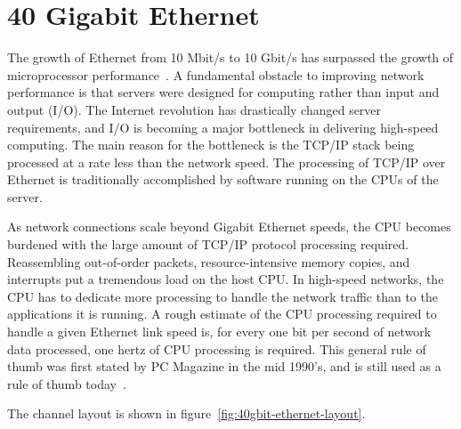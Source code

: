 
\chapter{40 Gigabit Ethernet}

The growth of Ethernet from 10 Mbit/s to 10 Gbit/s has surpassed
the growth of microprocessor performance~\cite{10gea-toe}.
A fundamental obstacle to improving network performance is that servers were designed
for computing rather than input and output (I/O).
The Internet revolution has drastically changed server requirements,
and I/O is becoming a major bottleneck in delivering high-speed computing.
The main reason for the bottleneck is the TCP/IP stack being processed at a rate less than the network speed.
The processing of TCP/IP over Ethernet is traditionally accomplished by software running on the CPUs of the server.

As network connections scale beyond Gigabit Ethernet speeds,
the CPU becomes burdened with the large amount of TCP/IP protocol processing required.
Reassembling out-of-order packets, resource-intensive memory copies, and interrupts put a tremendous load on the host CPU.
In high-speed networks, the CPU has to dedicate more processing to handle the network traffic than to the applications it is running.
A rough estimate of the CPU processing required to handle a given Ethernet link speed is,
for every one bit per second of network data processed, one hertz of CPU processing is required.
This general rule of thumb was first stated by PC Magazine in the mid 1990’s,
and is still used as a rule of thumb today~\cite{10gea-toe}.







The channel layout is shown in figure~\ref{fig:40gbit-ethernet-layout}.

